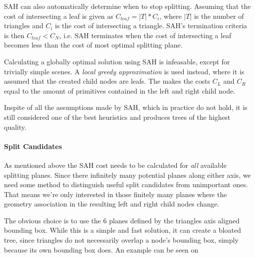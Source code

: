SAH can also automatically determine when to stop splitting. Assuming
that the cost of intersecting a leaf is given as $C_{leaf} = |T| *
C_i$, where $|T|$ is the number of triangles and $C_i$ is the cost of
intersecting a triangle. SAH's termination criteria is then $C_{leaf}
< C_N$, i.e. SAH terminates when the cost of intersecting a leaf
becomes less than the cost of most optimal splitting plane.


Calculating a globally optimal solution using SAH is infeasable,
except for trivially simple scenes. A \textit{local greedy
  approximation} is used instead, where it is assumed that the created
child nodes are leafs. The makes the costs $C_L$ and $C_R$ equal to
the amount of primitives contained in the left and right child node.

Inspite of all the assumptions made by SAH, which in practice do not
hold, it is still considered one of the best heuristics and produces
trees of the highest quality.



\paragraph{Split Candidates}


As mentioned above the SAH cost needs to be calculated for
\textit{all} available splitting planes. Since there infinitely many
potential planes along either axis, we need some method to distinguish
useful split candidates from unimportant ones. That means we're only
interested in those finitely many planes where the geometry
association in the resulting left and right child nodes change.


The obvious choice is to use the 6 planes defined by the triangles
axis aligned bounding box. While this is a simple and fast solution,
it can create a bloated tree, since triangles do not necessarily
overlap a node's bounding box, simply because its own bounding box
does. An example can be seen on 

